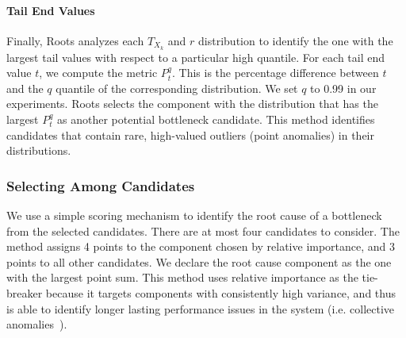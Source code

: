 \paragraph*{Tail End Values}
Finally, Roots analyzes each $T_{X_k}$ and $r$ distribution to identify the one 
with the largest tail values with respect to a particular high quantile.
For each tail end value $t$, we compute the metric $P^q_t$. 
This is the percentage difference between $t$ and the
$q$ quantile of the corresponding distribution. We set $q$ to 0.99 in our experiments.
Roots selects the component with the 
distribution that has the largest $P^q_t$ as another potential bottleneck candidate.
This method identifies
candidates that contain rare, high-valued outliers (point anomalies) in their distributions.

\subsubsection{Selecting Among Candidates}
We use a simple scoring mechanism to identify the root cause of a bottleneck 
from the selected candidates. There are at most four candidates to consider.  
The method assigns 4 points to the component chosen
by relative importance, and 3 points to all other candidates. 
We declare the root cause component as the one with the largest
point sum.  This method uses relative importance as the tie-breaker because it
targets components with consistently high variance, and thus is able to identify
longer lasting performance issues in the system
(i.e. collective anomalies~\cite{Chandola:2009:ADS:1541880.1541882}).
